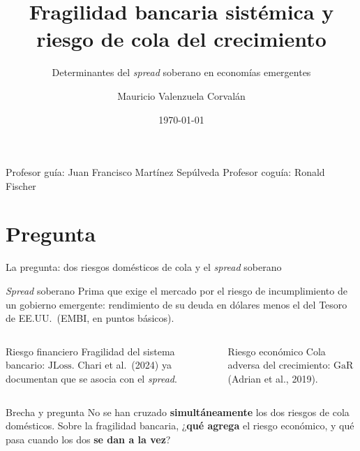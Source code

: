 \documentclass[aspectratio=169]{beamer}
\author{Mauricio Valenzuela Corvalán}
\institute[Universidad de Chile]{Departamento de Ingeniería Civil Industrial\\
\small Magíster en Economía Aplicada · Universidad de Chile}
\title[Fragilidad bancaria y riesgo de cola]{Fragilidad bancaria sistémica y riesgo de cola del crecimiento}
\subtitle{Determinantes del \textit{spread} soberano en economías emergentes}
\date{\today}
\newcommand{\JLoss}{\mathrm{JLoss}}
\newcommand{\GaR}{\mathrm{GaR}}
\begin{document}
\begin{frame}
\titlepage
\vspace{-8pt}
\centering
\footnotesize Profesor guía: Juan Francisco Martínez Sepúlveda \quad\quad
Profesor coguía: Ronald Fischer
\end{frame}

\section{Pregunta}
\begin{frame}{La pregunta: dos riesgos domésticos de cola y el \textit{spread} soberano}
\begin{exampleblock}{\textit{Spread} soberano}
\footnotesize Prima que exige el mercado por el riesgo de incumplimiento de un gobierno emergente: rendimiento de su deuda en dólares menos el del Tesoro de EE.UU.\ (EMBI, en puntos básicos).
\end{exampleblock}
\vspace{-8pt}
\begin{columns}[T]
\begin{block}{Riesgo financiero}
\footnotesize Fragilidad del sistema bancario: $\JLoss$. Chari et al.\ (2024) ya documentan que se asocia con el \textit{spread}.
\end{block}
\begin{block}{Riesgo económico}
\footnotesize Cola adversa del crecimiento: $\GaR$ (Adrian et al., 2019).
\end{block}
\end{columns}
\begin{alertblock}{Brecha y pregunta}
\footnotesize No se han cruzado \textbf{simultáneamente} los dos riesgos de cola domésticos. Sobre la fragilidad bancaria, ¿\textbf{qué agrega} el riesgo económico, y qué pasa cuando los dos \textbf{se dan a la vez}?
\end{alertblock}
\end{frame}

\end{document}
